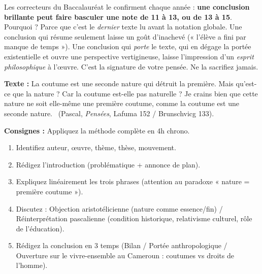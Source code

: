 \documentclass[11pt]{article}
\begin{document}
\begin{savaistu}
Les correcteurs du Baccalauréat le confirment chaque année : \textbf{une conclusion brillante peut faire basculer une note de 11 à 13, ou de 13 à 15}. Pourquoi ? Parce que c'est le \emph{dernier} texte lu avant la notation globale. Une conclusion qui résume seulement laisse un goût d'inachevé (« l'élève a fini par manque de temps »). Une conclusion qui \emph{porte} le texte, qui en dégage la portée existentielle et ouvre une perspective vertigineuse, laisse l'impression d'un \emph{esprit philosophique} à l'œuvre. C'est la signature de votre pensée. Ne la sacrifiez jamais.
\end{savaistu}

\begin{exercice}
\textbf{Texte :} \guillemotleft La coutume est une seconde nature qui détruit la première. Mais qu'est-ce que la nature ? Car la coutume est-elle pas naturelle ? Je crains bien que cette nature ne soit elle-même une première coutume, comme la coutume est une seconde nature. \guillemotright\ (Pascal, \emph{Pensées}, Lafuma 152 / Brunschvicg 133).

\textbf{Consignes :} Appliquez la méthode complète en 4h chrono.
\begin{enumerate}
    \item Identifiez auteur, œuvre, thème, thèse, mouvement.
    \item Rédigez l'introduction (problématique + annonce de plan).
    \item Expliquez linéairement les trois phrases (attention au paradoxe « nature = première coutume »).
    \item Discutez : Objection aristotélicienne (nature comme essence/fin) / Réinterprétation pascalienne (condition historique, relativisme culturel, rôle de l'éducation).
    \item Rédigez la conclusion en 3 temps (Bilan / Portée anthropologique / Ouverture sur le vivre-ensemble au Cameroun : coutumes vs droits de l'homme).
\end{enumerate}
\end{exercice}
\end{document}
